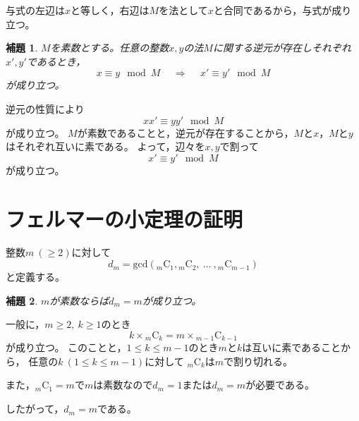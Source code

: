 \documentclass{article}
\makeatletter
\renewenvironment{proof}[1][\proofname]{\par
        \pushQED{\qed}
        \normalfont
        \topsep6\p@\@plus6\p@ \trivlist
        \item[\hskip\labelsep{\bfseries #1}\@addpunct{\bfseries}]\ignorespaces
    }{%
        \popQED\endtrivlist\@endpefalse
    }
\renewcommand{\proofname}{証明.}
\newtheorem{lemma}{補題}
\newcommand{\combination}[2]{{}_{#1} \mathrm{C}_{#2}}
\makeatother
\begin{document}
\begin{proof}
    与式の左辺は$x$と等しく，右辺は$M$を法として$x$と合同であるから，与式が成り立つ。
\end{proof}

\begin{screen}
    \begin{lemma}
        \label{lemma:inv:3}
        $M$を素数とする。任意の整数$x, y$の法$M$に関する逆元が存在しそれぞれ$x', y'$であるとき，
        \begin{equation}
            x \equiv y \mod{M}
            \hspace{15pt} \Longrightarrow \hspace{15pt}
            x' \equiv y' \mod{M}
        \end{equation}
        が成り立つ。
    \end{lemma}
\end{screen}

\begin{proof}
    逆元の性質により
    \begin{equation}
        xx' \equiv yy' \mod{M}
    \end{equation}
    が成り立つ。
    $M$が素数であることと，逆元が存在することから，$M$と$x$，$M$と$y$はそれぞれ互いに素である。
    よって，辺々を$x, y$で割って
    \begin{equation}
        x' \equiv y' \mod{M}
    \end{equation}
    が成り立つ。
\end{proof}



\section{フェルマーの小定理の証明}

整数$m\ (\geq 2)$に対して
\begin{equation}
    d_m = \mathrm{gcd} (\combination{m}{1}, \combination{m}{2},\ \ldots\ , \combination{m}{m-1})
\end{equation}
と定義する。

\begin{screen}
    \begin{lemma}
        \label{lemma:flt:1}
        $m$が素数ならば$d_m = m$が成り立つ。
    \end{lemma}
\end{screen}

\begin{proof}
    一般に，$m \geq 2,\ k \geq 1$のとき
    \begin{equation}
        k \times \combination{m}{k} = m \times \combination{m - 1}{k - 1}
    \end{equation}
    が成り立つ。
    このことと，$1 \leq k \leq m - 1$のとき$m$と$k$は互いに素であることから，
    任意の$k\ (1 \leq k \leq m - 1)$に対して
    $\combination{m}{k}$は$m$で割り切れる。

    また，$\combination{m}{1} = m$で$m$は素数なので$d_m = 1$または$d_m = m$が必要である。

    したがって，$d_m = m$である。
\end{proof}
\end{document}
